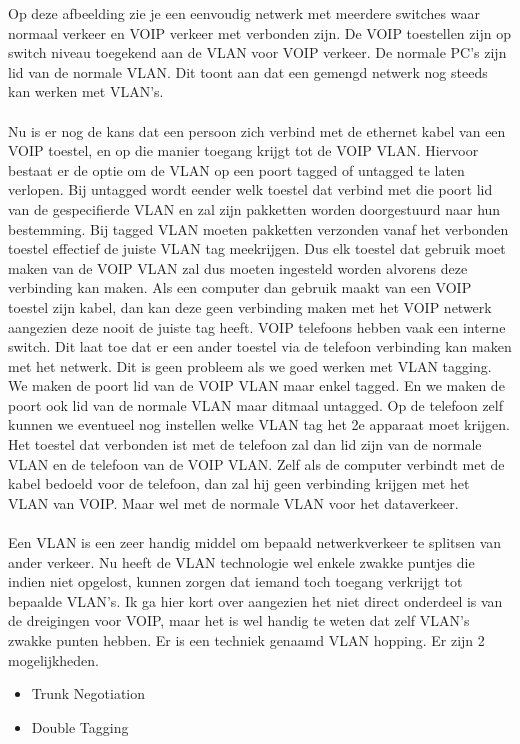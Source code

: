 \documentclass[pdftex,a4paper,12pt,twoside]{report}
\begin{document}
Op deze afbeelding zie je een eenvoudig netwerk met meerdere switches waar normaal verkeer en VOIP verkeer met verbonden zijn. De VOIP toestellen zijn op switch niveau toegekend aan de VLAN voor VOIP verkeer. De normale PC's zijn lid van de normale VLAN. Dit toont aan dat een gemengd netwerk nog steeds kan werken met VLAN's.
\\
\\
Nu is er nog de kans dat een persoon zich verbind met de ethernet kabel van een VOIP toestel, en op die manier toegang krijgt tot de VOIP VLAN. Hiervoor bestaat er de optie om de VLAN op een poort tagged of untagged te laten verlopen. Bij untagged wordt eender welk toestel dat verbind met die poort lid van de gespecifierde VLAN en zal zijn pakketten worden doorgestuurd naar hun bestemming. Bij tagged VLAN moeten pakketten verzonden vanaf het verbonden toestel effectief de juiste VLAN tag meekrijgen. Dus elk toestel dat gebruik moet maken van de VOIP VLAN zal dus moeten ingesteld worden alvorens deze verbinding kan maken. Als een computer dan gebruik maakt van een VOIP toestel zijn kabel, dan kan deze geen verbinding maken met het VOIP netwerk aangezien deze nooit de juiste tag heeft. \newpage
VOIP telefoons hebben vaak een interne switch. Dit laat toe dat er een ander toestel via de telefoon verbinding kan maken met het netwerk. Dit is geen probleem als we goed werken met VLAN tagging. We maken de poort lid van de VOIP VLAN maar enkel tagged. En we maken de poort ook lid van de normale VLAN maar ditmaal untagged. Op de telefoon zelf kunnen we eventueel nog instellen welke VLAN tag het 2e apparaat moet krijgen. Het toestel dat verbonden ist met de telefoon zal dan lid zijn van de normale VLAN en de telefoon van de VOIP VLAN. Zelf als de computer verbindt met de kabel bedoeld voor de telefoon, dan zal hij geen verbinding krijgen met het VLAN van VOIP. Maar wel met de normale VLAN voor het dataverkeer. 
\\ \\
Een VLAN is een zeer handig middel om bepaald netwerkverkeer te splitsen van ander verkeer. Nu heeft de VLAN technologie wel enkele zwakke puntjes die indien niet opgelost, kunnen zorgen dat iemand toch toegang verkrijgt tot bepaalde VLAN's. Ik ga hier kort over aangezien het niet direct onderdeel is van de dreigingen voor VOIP, maar het is wel handig te weten dat zelf VLAN's zwakke punten hebben. Er is een techniek genaamd VLAN hopping. Er zijn 2 mogelijkheden.
\begin{itemize}
		\item{Trunk Negotiation}
		\item{Double Tagging}
\end{itemize}
\end{document}
